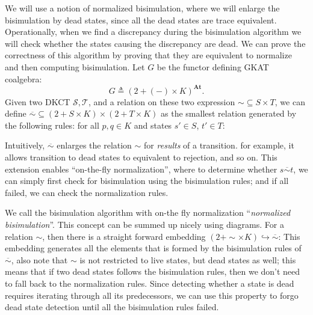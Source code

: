 \documentclass[acmsmall,screen]{acmart}
\newcommand{\At}{\mathbf{At}}
\newcommand{\closSim}{\mathrel{\overline{\sim}}}
\begin{document}
We will use a notion of normalized bisimulation, where we will enlarge the bisimulation by dead states, since all the dead states are trace equivalent.
Operationally, when we find a discrepancy during the bisimulation algorithm we will check whether the states causing the discrepancy are dead.
We can prove the correctness of this algorithm by proving that they are equivalent to normalize and then computing bisimulation.
Let \(G\) be the functor defining GKAT coalgebra: \[G ≜ (2 + (-) × K)^{\At}.\]
Given two DKCT \(𝒮, 𝒯\), and a relation on these two expression \({∼} ⊆ S × T\), we can define \({\closSim} ⊆ (2 + S × K) × (2 + T × K)\) as the smallest relation generated by the following rules: for all \(p, q ∈ K\) and states \(s' ∈ S\), \(t' ∈ T\):
Intuitively, \({\closSim}\) enlarges the relation \(∼\) for \emph{results} of a transition. for example, it allows transition to dead states to equivalent to rejection, and so on.
This extension enables ``on-the-fly normalization'', where to determine whether \(s \closSim t\), we can simply first check for bisimulation using the bisimulation rules; and if all failed, we can check the normalization rules.

We call the bisimulation algorithm with on-the fly normalization ``\emph{normalized bisimulation}''.
This concept can be summed up nicely using diagrams.
For a relation \(∼\), then there is a straight forward embedding \((2 + {∼} × K) ↪ {\closSim}\):
This embedding generates all the elements that is formed by the bisimulation rules of \(\closSim\),
also note that \(∼\) is not restricted to live states, but dead states as well; this means that if two dead states follows the bisimulation rules, then we don't need to fall back to the normalization rules.
Since detecting whether a state is dead requires iterating through all its predecessors, we can use this property to forgo dead state detection until all the bisimulation rules failed.
\end{document}
